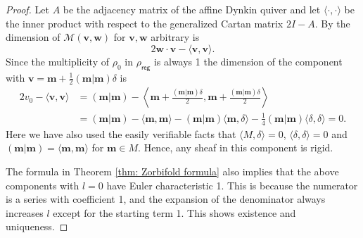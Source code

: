 \documentclass{amsart}
\theoremstyle{definition}
\newcommand{\half}{\frac{1}{2}}
\newcommand{\reg}{\mathsf{reg}}
\newcommand{\mvec}{\bm{m}}
\newcommand{\vvec}{\bm{v }}
\newcommand{\wvec}{\bm{w }}
\begin{document}
\begin{proof}
	Let $A$ be the adjacency matrix of the affine Dynkin quiver and let $\langle \cdot, \cdot \rangle$ be the inner product with respect to the generalized Cartan matrix $2I-A$.
	By \cite[(2.6)]{nakajima1994instantons}
	the dimension of $\mathcal{M}(\vvec,\wvec)$  for $\vvec,\wvec$ arbitrary is
	\[ 2\wvec \cdot \vvec - \langle \vvec, \vvec \rangle.  \]
	Since the multiplicity of $\rho_0$ in $\rho_{\reg}$ is always 1 the dimension of the component with $\vvec=\mvec+\half( \mvec| \mvec)\delta$ is
	\begin{align*} 2v_0 - \langle \vvec, \vvec \rangle & = (\mvec| \mvec ) - \left\langle \mvec+\frac{( \mvec| \mvec )\delta}{2}, \mvec+\frac{( \mvec| \mvec )\delta}{2} \right\rangle \\
	& = (\mvec| \mvec ) - \langle \mvec, \mvec \rangle - ( \mvec| \mvec) \langle \mvec, \delta \rangle  -\frac{1}{4} ( \mvec| \mvec)\langle \delta, \delta \rangle =
	0.  \end{align*}
	Here we have also used the easily verifiable facts that $\langle M, \delta \rangle = 0$, $\langle \delta, \delta \rangle = 0$ and $(\mvec| \mvec ) = \langle \mvec, \mvec \rangle$ for $\mvec \in M$. Hence, any sheaf in this component is rigid.
	
	The formula in Theorem \ref{thm: Zorbifold formula} also implies that the above components with $l=0$ have Euler characteristic 1. This is because the numerator is a series with coefficient 1, and the expansion of the denominator always increases $l$ except for the starting term 1. This shows existence and uniqueness.
	
\end{proof}
\end{document}
